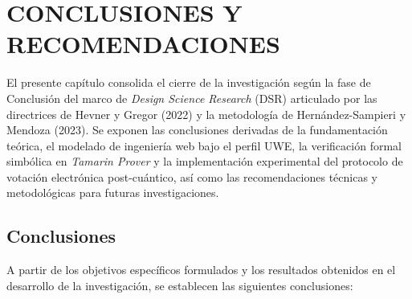 \chapter{CONCLUSIONES Y RECOMENDACIONES}
\label{cap:conclusiones_recomendaciones}

El presente capítulo consolida el cierre de la investigación según la fase de Conclusión del marco de \textit{Design Science Research} (DSR) articulado por las directrices de Hevner y Gregor (2022) y la metodología de Hernández-Sampieri y Mendoza (2023). Se exponen las conclusiones derivadas de la fundamentación teórica, el modelado de ingeniería web bajo el perfil UWE, la verificación formal simbólica en \textit{Tamarin Prover} y la implementación experimental del protocolo de votación electrónica post-cuántico, así como las recomendaciones técnicas y metodológicas para futuras investigaciones.

\section{Conclusiones}

A partir de los objetivos específicos formulados y los resultados obtenidos en el desarrollo de la investigación, se establecen las siguientes conclusiones:

